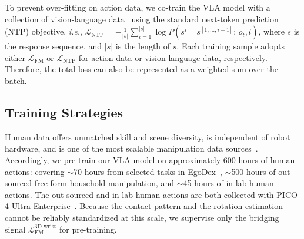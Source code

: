 %
To prevent over-fitting on action data, we co-train the VLA model with a collection of vision-language data~\cite{cheang2025gr3,intelligence2025pi_0.5,zitkovich2023rt2} using the standard next-token prediction (NTP) objective, \textit{i.e.}, 
%
$\mathcal{L}_{\text{NTP}} = - \frac{1}{|s|}\sum\nolimits_{i=1}^{|s|} \log P\!\left(s^{i} \,\middle\vert\, s^{[1, \dots, i-1]};\, o_{t}, l\right)$,
% 
where $s$ is the response sequence, and $|s|$ is the length of $s$.
%
Each training sample adopts either $\mathcal{L}_{\text{FM}}$ or $\mathcal{L}_{\text{NTP}}$ for action data or vision-language data, respectively.
% 
Therefore, the total loss can also be represented as a weighted sum over the batch.



\subsection{Training Strategies}
% 
\label{sec:method:strategy}


%
Human data offers unmatched skill and scene diversity, is independent of robot hardware, and is one of the most scalable manipulation data sources~\cite{hoque2025egodex,grauman2022ego4d,zheng2026egoscale}.
%
Accordingly, we pre-train our VLA model on approximately 600 hours of human actions: covering $\sim$70 hours from selected tasks in EgoDex~\cite{hoque2025egodex}, $\sim$500 hours of out-sourced free-form household manipulation, and $\sim$45 hours of in-lab human actions.
% 
The out-sourced and in-lab human actions are both collected with PICO 4 Ultra Enterprise~\cite{cheang2025gr3}.
% 
Because the contact pattern and the rotation estimation cannot be reliably standardized at this scale, we supervise only the bridging signal $\mathcal{L}_{\text{FM}}^{\text{3D-wrist}}$ for pre-training.




